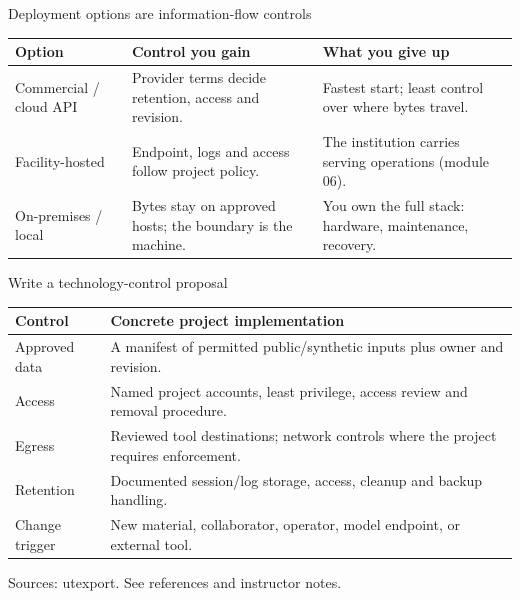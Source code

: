 \documentclass[aspectratio=169,11pt]{beamer}
\begin{document}
\begin{frame}[t,fragile]{Deployment options are information-flow controls}
\fontsize{10.5}{12.5}\selectfont\setlength{\tabcolsep}{4pt}\renewcommand{\arraystretch}{1.15}
\begin{tabular}{>{\raggedright\arraybackslash}p{}>{\raggedright\arraybackslash}p{}>{\raggedright\arraybackslash}p{}}
\toprule
\textbf{Option} & \textbf{Control you gain} & \textbf{What you give up} \\ \midrule
Commercial / cloud API & Provider terms decide retention, access and revision. & Fastest start; least control over where bytes travel. \\[2pt]
Facility-hosted & Endpoint, logs and access follow project policy. & The institution carries serving operations (module 06). \\[2pt]
On-premises / local & Bytes stay on approved hosts; the boundary is the machine. & You own the full stack: hardware, maintenance, recovery. \\[2pt]
\bottomrule\end{tabular}\par\vspace{2mm}
\end{frame}
\begin{frame}[t,fragile]{Write a technology-control proposal}
\fontsize{10.5}{12.5}\selectfont\setlength{\tabcolsep}{4pt}\renewcommand{\arraystretch}{1.15}
\begin{tabular}{>{\raggedright\arraybackslash}p{}>{\raggedright\arraybackslash}p{}}
\toprule
\textbf{Control} & \textbf{Concrete project implementation} \\ \midrule
Approved data & A manifest of permitted public/synthetic inputs plus owner and revision. \\[2pt]
Access & Named project accounts, least privilege, access review and removal procedure. \\[2pt]
Egress & Reviewed tool destinations; network controls where the project requires enforcement. \\[2pt]
Retention & Documented session/log storage, access, cleanup and backup handling. \\[2pt]
Change trigger & New material, collaborator, operator, model endpoint, or external tool. \\[2pt]
\bottomrule\end{tabular}\par\vspace{2mm}
\vfill{\fontsize{6.5}{8}\selectfont\color{UTgray} Sources: utexport. See references and instructor notes.\par}
\end{frame}
\end{document}
